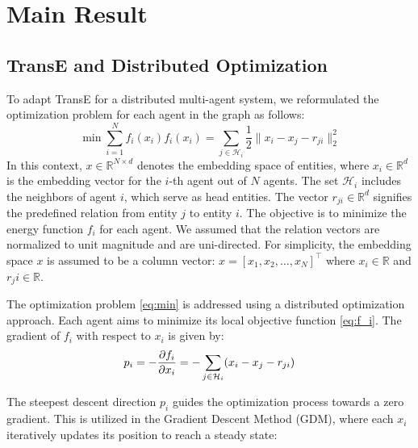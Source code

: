 \documentclass[letterpaper, 10 pt, conference]{ieeeconf}  %
\begin{document}
\section{Main Result}

\subsection{TransE and Distributed Optimization}
To adapt TransE for a distributed multi-agent system, we reformulated the optimization problem for each agent in the graph as follows:
\begin{subequations}
\begin{equation}\label{eq:min}
    \min \sum_{i=1}^{N} f_{i} (x_{i})
\end{equation}
\begin{equation}\label{eq:f_i}
    f_{i}(x_{i}) = \sum_{j \in \mathcal{H}_{i}} \frac{1}{2} \|x_{i} - x_{j} - r_{ji}\|_{2}^{2}
\end{equation}
\end{subequations}
In this context, \( x \in \mathbb{R}^{N \times d} \) denotes the embedding space of entities, where \( x_i \in \mathbb{R}^d \) is the embedding vector for the \(i\)-th agent out of \( N \) agents. The set \( \mathcal{H}_i \) includes the neighbors of agent \( i \), which serve as head entities. The vector \( r_{ji} \in \mathbb{R}^d \) signifies the predefined relation from entity \( j \) to entity \( i \). The objective is to minimize the energy function \( f_i \) for each agent. We assumed that the relation vectors are normalized to unit magnitude and are uni-directed. For simplicity, the embedding space \(x\) is assumed to be a column vector: \(x = [x_1, x_2, \ldots, x_N]^\top\) where \(x_i \in \mathbb{R}\) and \(r_ji \in \mathbb{R}\).

The optimization problem \eqref{eq:min} is addressed using a distributed optimization approach. Each agent aims to minimize its local objective function \eqref{eq:f_i}. The gradient of \( f_i \) with respect to \( x_i \) is given by:
\begin{equation}
    p_i = - \pdv{f_{i}}{x_{i}} = - \sum_{j \in \mathcal{H}_i} (x_{i} - x_{j} - r_{ji})
    \label{eq:p}
\end{equation}

The steepest descent direction \( p_i \) guides the optimization process towards a zero gradient. This is utilized in the Gradient Descent Method (GDM), where each \( x_i \) iteratively updates its position to reach a steady state:
\end{document}
